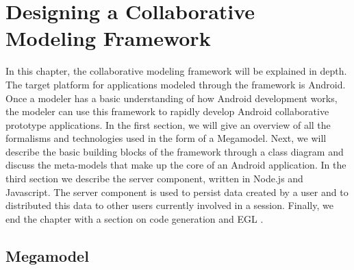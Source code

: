 \chapter{Designing a Collaborative Modeling Framework}

In this chapter, the collaborative modeling framework will be explained in depth. The target platform for applications modeled through the framework is Android. Once a modeler has a basic understanding of how Android development works, the modeler can use this framework to rapidly develop Android collaborative prototype applications. In the first section, we will give an overview of all the formalisms and technologies used in the form of a Megamodel. Next, we will describe the basic building blocks of the framework through a class diagram and discuss the meta-models that make up the core of an Android application. In the third section we describe the server component, written in Node.js \cite{NodeJS} and Javascript. The server component is used to persist data created by a user and to distributed this data to other users currently involved in a session. Finally, we end the chapter with a section on code generation and EGL \cite{EGL}.

\section{Megamodel}

